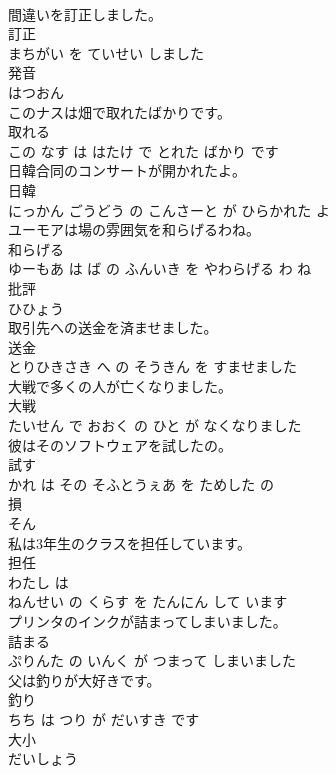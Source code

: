 \documentclass[8pt]{extreport}
\begin{document}
\begin{CJK}{UTF8}{min}
\\	間違いを訂正しました。	
\\	訂正 
\\	まちがい を ていせい しました			
\\	発音	
\\	はつおん		
\\	このナスは畑で取れたばかりです。	
\\	取れる 
\\	この なす は はたけ で とれた ばかり です			
\\	日韓合同のコンサートが開かれたよ。	
\\	日韓 
\\	にっかん ごうどう の こんさーと が ひらかれた よ			
\\	ユーモアは場の雰囲気を和らげるわね。	
\\	和らげる 
\\	ゆーもあ は ば の ふんいき を やわらげる わ ね			
\\	批評	
\\	ひひょう		
\\	取引先への送金を済ませました。	
\\	送金 
\\	とりひきさき へ の そうきん を すませました			
\\	大戦で多くの人が亡くなりました。	
\\	大戦 
\\	たいせん で おおく の ひと が なくなりました			
\\	彼はそのソフトウェアを試したの。	
\\	試す 
\\	かれ は その そふとうぇあ を ためした の			
\\	損	
\\	そん		
\\	私は3年生のクラスを担任しています。	
\\	担任 
\\	わたし は 
\\	ねんせい の くらす を たんにん して います			
\\	プリンタのインクが詰まってしまいました。	
\\	詰まる 
\\	ぷりんた の いんく が つまって しまいました			
\\	父は釣りが大好きです。	
\\	釣り 
\\	ちち は つり が だいすき です			
\\	大小	
\\	だいしょう		

\end{CJK}
\end{document}
